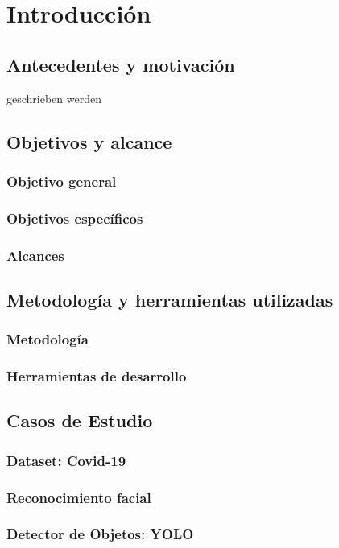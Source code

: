 \chapter{Introducci\'on}
\label{cap:intro}

\section{Antecedentes y motivaci\'on}
\label{intro:motivacion}

geschrieben werden

\section{Objetivos y alcance}
\label{intro:objetivos}


\subsection{Objetivo general}


\subsection{Objetivos espec\'ificos}


\subsection{Alcances}


\section{Metodolog\'ia y herramientas utilizadas}
\label{intro:metodologia}

\subsection{Metodolog\'ia}

\subsection{Herramientas de desarrollo}

\section{Casos de Estudio}
\label{intro:casos_estudio}

\subsection{Dataset: Covid-19}

\subsection{Reconocimiento facial}

\subsection{Detector de Objetos: YOLO}

